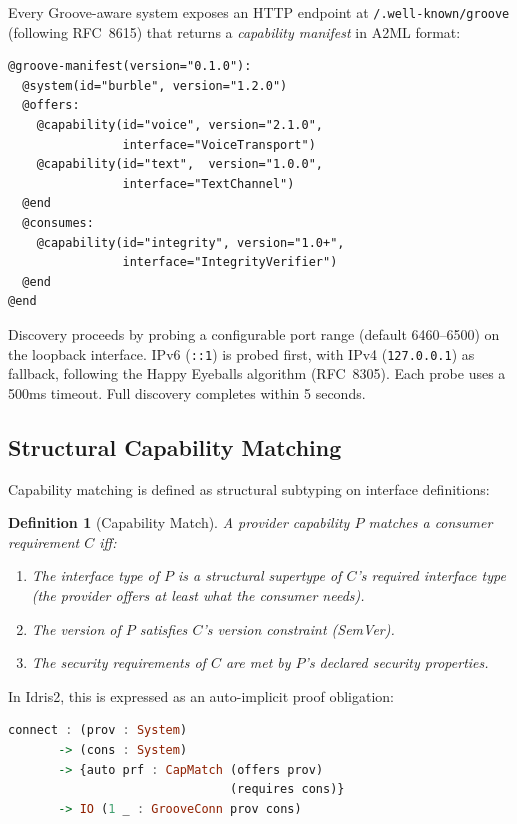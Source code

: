 \documentclass[11pt,a4paper]{article}
\newtheorem{definition}{Definition}
\begin{document}
Every Groove-aware system exposes an HTTP endpoint at
\texttt{/.well-known/groove} (following RFC~8615) that returns a
\emph{capability manifest} in A2ML format:

\begin{lstlisting}[caption={Groove manifest for a voice platform}]
@groove-manifest(version="0.1.0"):
  @system(id="burble", version="1.2.0")
  @offers:
    @capability(id="voice", version="2.1.0",
                interface="VoiceTransport")
    @capability(id="text",  version="1.0.0",
                interface="TextChannel")
  @end
  @consumes:
    @capability(id="integrity", version="1.0+",
                interface="IntegrityVerifier")
  @end
@end
\end{lstlisting}

Discovery proceeds by probing a configurable port range (default 6460--6500)
on the loopback interface. IPv6 (\texttt{::1}) is probed first, with IPv4
(\texttt{127.0.0.1}) as fallback, following the Happy Eyeballs algorithm
(RFC~8305). Each probe uses a 500ms timeout. Full discovery completes within
5 seconds.

\subsection{Structural Capability Matching}
\label{sec:types}

Capability matching is defined as structural subtyping on interface
definitions:

\begin{definition}[Capability Match]
A provider capability $P$ matches a consumer requirement $C$ iff:
\begin{enumerate}
\item The interface type of $P$ is a structural supertype of $C$'s
  required interface type (the provider offers at least what the consumer
  needs).
\item The version of $P$ satisfies $C$'s version constraint (SemVer).
\item The security requirements of $C$ are met by $P$'s declared
  security properties.
\end{enumerate}
\end{definition}

In Idris2, this is expressed as an auto-implicit proof obligation:

\begin{lstlisting}[language=Haskell,caption={Type-safe connection in Idris2}]
connect : (prov : System)
       -> (cons : System)
       -> {auto prf : CapMatch (offers prov)
                               (requires cons)}
       -> IO (1 _ : GrooveConn prov cons)
\end{lstlisting}
\end{document}
